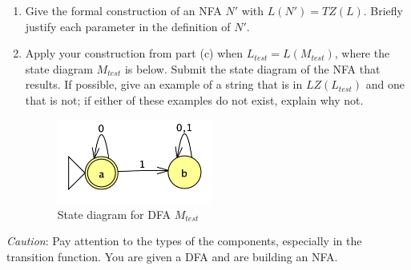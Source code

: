 \begin{enumerate}
\begin{enumerate}
\item Give the formal construction of an NFA $N'$ with $L(N') = TZ(L)$.  Briefly justify 
each parameter in the definition of  $N'$. 
\item Apply your construction from part (c)  when $L_{test} = L(M_{test})$, where the 
state diagram $M_{test}$ is below.  Submit the state diagram of the NFA that results.
If possible, give an example of a string that is in $LZ(L_{test})$ and one that is not; if either of these examples
do not exist, explain why not.
\begin{figure}[h]
   \centering
   \includegraphics[width=2in]{../../resources/machines/MtestDFA.png}
   \caption{State diagram for DFA $M_{test}$}
\end{figure}
\end{enumerate}
{\it Caution}: Pay attention to the types of the components, especially
in the transition function.  You are given a DFA and are building an NFA.
\end{enumerate}
